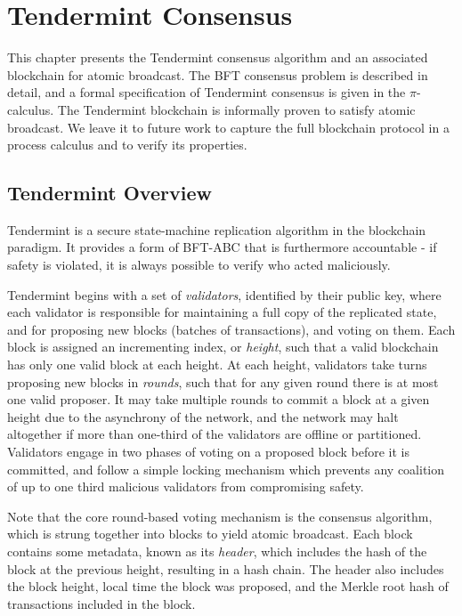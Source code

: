 \chapter{Tendermint Consensus}
\label{ch:tendermint}

This chapter presents the Tendermint consensus algorithm 
and an associated blockchain for atomic broadcast.
The BFT consensus problem is described in detail, 
and a formal specification of Tendermint consensus is given in the $\pi$-calculus.
The Tendermint blockchain is informally proven to satisfy atomic broadcast.
We leave it to future work to capture the full blockchain protocol in 
a process calculus and to verify its properties.

\section{Tendermint Overview}

Tendermint is a secure state-machine replication algorithm in the blockchain paradigm.
It provides a form of BFT-ABC that is furthermore accountable - 
if safety is violated, it is always possible to verify who acted maliciously.

Tendermint begins with a set of \emph{validators}, identified by their public key,
where each validator is responsible for maintaining a full copy of the replicated state,
and for proposing new blocks (batches of transactions), and voting on them.
Each block is assigned an incrementing index, or \emph{height}, 
such that a valid blockchain has only one valid block at each height.
At each height, validators take turns proposing new blocks in \emph{rounds}, 
such that for any given round there is at most one valid proposer.
It may take multiple rounds to commit a block at a given height due to the asynchrony of the network,
and the network may halt altogether if more than one-third of the validators are offline or partitioned.
Validators engage in two phases of voting on a proposed block before it is committed, 
and follow a simple locking mechanism which prevents any coalition of up to 
one third malicious validators from compromising safety.

Note that the core round-based voting mechanism is the consensus algorithm, 
which is strung together into blocks to yield atomic broadcast.
Each block contains some metadata, known as its \emph{header}, 
which includes the hash of the block at the previous height, resulting in a hash chain.
The header also includes the block height, local time the block was proposed, 
and the Merkle root hash of transactions included in the block.

